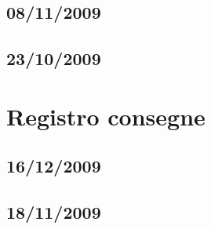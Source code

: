 \documentclass[a4paper, 12pt]{report}
\begin{document}
\section{08/11/2009}





\section{23/10/2009}




\chapter{Registro consegne}

\section{16/12/2009}




\section{18/11/2009}



\end{document}
